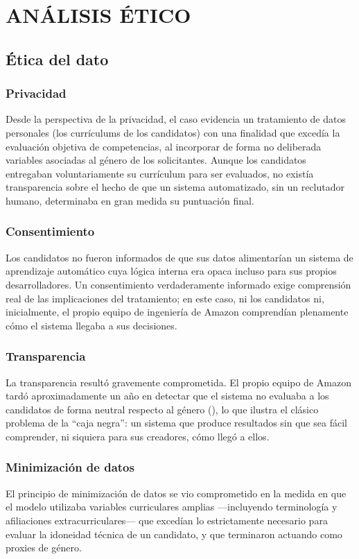 \chapter{ANÁLISIS ÉTICO}

\section{Ética del dato}

\subsection{Privacidad}
Desde la perspectiva de la privacidad, el caso evidencia un tratamiento de datos personales (los currículums de los candidatos) con una finalidad que excedía la evaluación objetiva de competencias, al incorporar de forma no deliberada variables asociadas al género de los solicitantes. Aunque los candidatos entregaban voluntariamente su currículum para ser evaluados, no existía transparencia sobre el hecho de que un sistema automatizado, sin un reclutador humano, determinaba en gran medida su puntuación final.

\subsection{Consentimiento}
Los candidatos no fueron informados de que sus datos alimentarían un sistema de aprendizaje automático cuya lógica interna era opaca incluso para sus propios desarrolladores. Un consentimiento verdaderamente informado exige comprensión real de las implicaciones del tratamiento; en este caso, ni los candidatos ni, inicialmente, el propio equipo de ingeniería de Amazon comprendían plenamente cómo el sistema llegaba a sus decisiones.

\subsection{Transparencia}
La transparencia resultó gravemente comprometida. El propio equipo de Amazon tardó aproximadamente un año en detectar que el sistema no evaluaba a los candidatos de forma neutral respecto al género (\textcite{dastin2018}), lo que ilustra el clásico problema de la ``caja negra'': un sistema que produce resultados sin que sea fácil comprender, ni siquiera para sus creadores, cómo llegó a ellos.

\subsection{Minimización de datos}
El principio de minimización de datos se vio comprometido en la medida en que el modelo utilizaba variables curriculares amplias —incluyendo terminología y afiliaciones extracurriculares— que excedían lo estrictamente necesario para evaluar la idoneidad técnica de un candidato, y que terminaron actuando como proxies de género.

